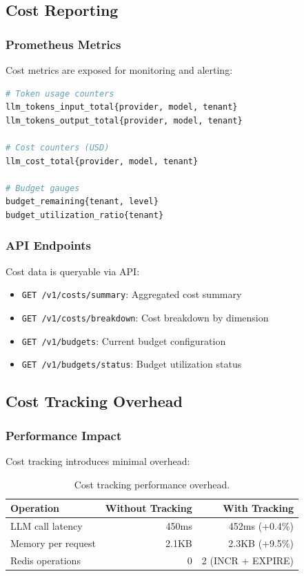 \subsection{Cost Reporting}

\subsubsection{Prometheus Metrics}

Cost metrics are exposed for monitoring and alerting:

\begin{lstlisting}[language=python,caption={Cost-related Prometheus metrics.}]
# Token usage counters
llm_tokens_input_total{provider, model, tenant}
llm_tokens_output_total{provider, model, tenant}

# Cost counters (USD)
llm_cost_total{provider, model, tenant}

# Budget gauges
budget_remaining{tenant, level}
budget_utilization_ratio{tenant}
\end{lstlisting}

\subsubsection{API Endpoints}

Cost data is queryable via API:

\begin{itemize}
    \item \texttt{GET /v1/costs/summary}: Aggregated cost summary
    \item \texttt{GET /v1/costs/breakdown}: Cost breakdown by dimension
    \item \texttt{GET /v1/budgets}: Current budget configuration
    \item \texttt{GET /v1/budgets/status}: Budget utilization status
\end{itemize}

\subsection{Cost Tracking Overhead}

\subsubsection{Performance Impact}

Cost tracking introduces minimal overhead:

\begin{table}[ht]
\centering
\caption{Cost tracking performance overhead.}
\label{tab:cost-overhead}
\small
\begin{tabular}{lrr}
\hline
\textbf{Operation} & \textbf{Without Tracking} & \textbf{With Tracking} \\
\hline
LLM call latency & 450ms & 452ms (+0.4\%) \\
Memory per request & 2.1KB & 2.3KB (+9.5\%) \\
Redis operations & 0 & 2 (INCR + EXPIRE) \\
\hline
\end{tabular}
\end{table}

